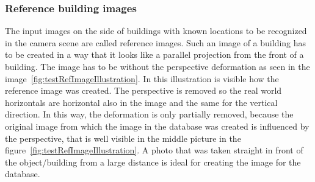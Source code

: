 \documentclass[thesis=B,english]{FITthesis}[2019/12/23]
\begin{document}
            \subsubsection*{Reference building images}
                The input images on the side of buildings with known locations to be recognized in the camera scene are called reference images. Such an image of a building has to be created in a way that it looks like a parallel projection from the front of a building. The image has to be without the perspective deformation as seen in the image~\ref{fig:testRefImageIllustration}. In this illustration is visible how the reference image was created. The perspective is removed so the real world horizontals are horizontal also in the image and the same for the vertical direction. In this way, the deformation is only partially removed, because the original image from which the image in the database was created is influenced by the perspective, that is well visible in the middle picture in the figure~\ref{fig:testRefImageIllustration}. A photo that was taken straight in front of the object/building from a large distance is ideal for creating the image for the database.
                
\end{document}
